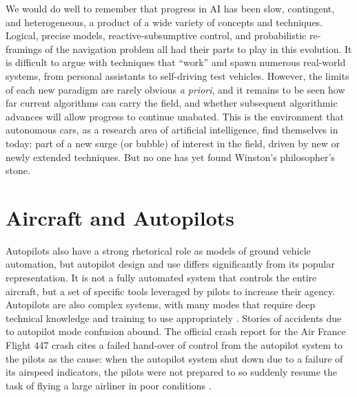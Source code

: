 We would do well to remember that 
progress in AI has been slow, contingent, and heterogeneous, a product of a
wide variety of concepts and techniques. Logical, precise models,
reactive-subsumptive control, and probabilistic re-framings of the
navigation problem all had their parts to play in this evolution. It
is difficult to argue with techniques that ``work'' and
spawn numerous real-world systems, from personal assistants to
self-driving test vehicles. However, the limits of each new paradigm are rarely
obvious \emph{a priori}, and it remains to be seen how far current
algorithms can carry the field, and whether subsequent algorithmic
advances will allow progress to continue unabated. This is the
environment that autonomous cars, as a 
research area of artificial intelligence, find themselves in today:
part of a new surge (or bubble) of interest in the field, driven by new
or newly extended techniques. But no one has yet found Winston's
philosopher's stone.


\section{Aircraft and Autopilots}



Autopilots also have a strong rhetorical role as
models of ground vehicle automation, but autopilot design and use differs 
significantly from its popular representation. It is not a fully automated
system that controls the entire aircraft, but a set of specific tools
leveraged by pilots to increase their agency. Autopilots are also complex systems, with many modes
that require deep technical knowledge and training to use
appropriately \cite{harrisPsych}. Stories of accidents
due to autopilot mode confusion abound. The official crash report for
the Air France Flight 447 crash cites a
failed hand-over of control from the autopilot system to the pilots as
the cause:
when the autopilot system shut down due to a failure of its airspeed
indicators, the pilots were not prepared to so suddenly resume the
task of flying a large airliner in poor conditions \cite{AF447}.

